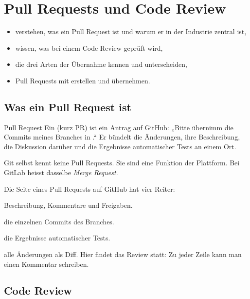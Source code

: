 \chapter{Pull Requests und Code Review}
\label{kap:pr}

\begin{lernziele}
\begin{itemize}[nosep]
  \item verstehen, was ein Pull Request ist und warum er in der Industrie zentral ist,
  \item wissen, was bei einem Code Review geprüft wird,
  \item die drei Arten der Übernahme kennen und unterscheiden,
  \item Pull Requests mit  erstellen und übernehmen.
\end{itemize}
\end{lernziele}

\section{Was ein Pull Request ist}

\begin{definition}{Pull Request}
Ein  (kurz PR) ist ein Antrag auf GitHub: „Bitte übernimm die Commits
meines Branches in .“ Er bündelt die Änderungen, ihre Beschreibung, die
Diskussion darüber und die Ergebnisse automatischer Tests an einem Ort.
\end{definition}

Git selbst kennt keine Pull Requests. Sie sind eine Funktion der Plattform. Bei GitLab
heisst dasselbe \emph{Merge Request}.

Die Seite eines Pull Requests auf GitHub hat vier Reiter:

\begin{description}[style=nextline, leftmargin=1.2cm]
  \item[Conversation] Beschreibung, Kommentare und Freigaben.
  \item[Commits] die einzelnen Commits des Branches.
  \item[Checks] die Ergebnisse automatischer Tests.
  \item[Files changed] alle Änderungen als Diff. Hier findet das Review statt: Zu jeder
    Zeile kann man einen Kommentar schreiben.
\end{description}

\section{Code Review}

